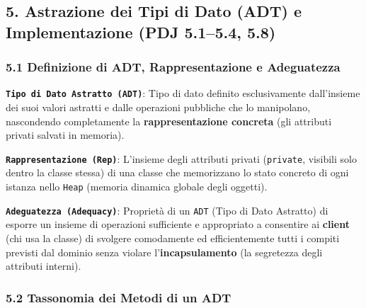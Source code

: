 \subsection{5. Astrazione dei Tipi di Dato (ADT) e Implementazione (PDJ 5.1–5.4, 5.8)}\label{5-astrazione-dei-tipi-di-dato-adt-e-implementazione-pdj-5-1-5-4-5-8}

\subsubsection{5.1 Definizione di ADT, Rappresentazione e Adeguatezza}\label{5-1-definizione-di-adt-rappresentazione-e-adeguatezza}

\textbf{\texttt{Tipo di Dato Astratto (ADT)}}: Tipo di dato definito esclusivamente dall'insieme dei suoi valori astratti e dalle operazioni pubbliche che lo manipolano, nascondendo completamente la \textbf{rappresentazione concreta} (gli attributi privati salvati in memoria).

\textbf{\texttt{Rappresentazione (Rep)}}: L'insieme degli attributi privati (\texttt{private}, visibili solo dentro la classe stessa) di una classe che memorizzano lo stato concreto di ogni istanza nello \texttt{Heap} (memoria dinamica globale degli oggetti).

\textbf{\texttt{Adeguatezza (Adequacy)}}: Proprietà di un \texttt{ADT} (Tipo di Dato Astratto) di esporre un insieme di operazioni sufficiente e appropriato a consentire ai \textbf{client} (chi usa la classe) di svolgere comodamente ed efficientemente tutti i compiti previsti dal dominio senza violare l'\textbf{incapsulamento} (la segretezza degli attributi interni).

\subsubsection{5.2 Tassonomia dei Metodi di un ADT}\label{5-2-tassonomia-dei-metodi-di-un-adt}

